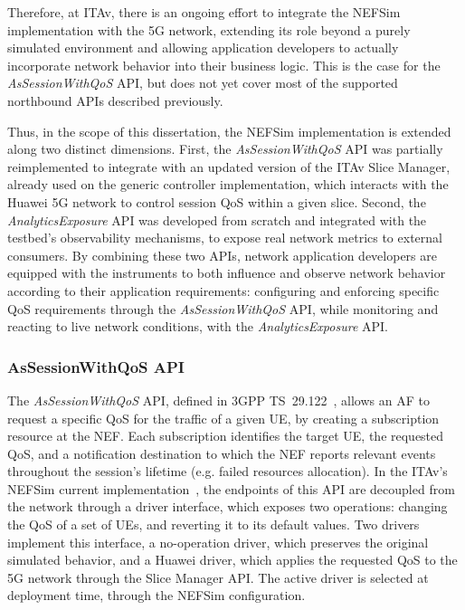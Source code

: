 Therefore, at \acs{ITAv}, there is an ongoing effort to integrate the \acs{NEF}Sim implementation with the \acs{5G} network, extending its role beyond a purely simulated environment and allowing application developers to actually incorporate network behavior into their business logic. This is the case for the \textit{AsSessionWithQoS} \acs{API}, but does not yet cover most of the supported northbound \acsp{API} described previously.

Thus, in the scope of this dissertation, the \acs{NEF}Sim implementation is extended along two distinct dimensions. First, the \textit{AsSessionWithQoS} \acs{API} was partially reimplemented to integrate with an updated version of the \acs{ITAv} Slice Manager, already used on the generic controller implementation, which interacts with the Huawei \acs{5G} network to control session \acs{QoS} within a given slice. Second, the \textit{AnalyticsExposure} \acs{API} was developed from scratch and integrated with the testbed's observability mechanisms, to expose real network metrics to external consumers. By combining these two \acsp{API}, network application developers are equipped with the instruments to both influence and observe network behavior according to their application requirements: configuring and enforcing specific \acs{QoS} requirements through the \textit{AsSessionWithQoS} \acs{API}, while monitoring and reacting to live network conditions, with the \textit{AnalyticsExposure} \acs{API}.

\subsubsection{AsSessionWithQoS \acs{API}}
\label{chap:impl:exposure:nef:AsSessionWithQoS}

The \textit{AsSessionWithQoS} \acs{API}, defined in \acs{3GPP} TS~29.122~\cite{ETSI_TS_129_122_V18_8_0}, allows an \acs{AF} to request a specific \acs{QoS} for the traffic of a given \acs{UE}, by creating a subscription resource at the \acs{NEF}. Each subscription identifies the target \acs{UE}, the requested \acs{QoS}, and a notification destination to which the \acs{NEF} reports relevant events throughout the session's lifetime (e.g. failed resources allocation). In the \acs{ITAv}'s \acs{NEF}Sim current implementation~\cite{NEFemulatorAtnog}, the endpoints of this \acs{API} are decoupled from the network through a driver interface, which exposes two operations: changing the \acs{QoS} of a set of \acsp{UE}, and reverting it to its default values. Two drivers implement this interface, a no-operation driver, which preserves the original simulated behavior, and a Huawei driver, which applies the requested \acs{QoS} to the \acs{5G} network through the Slice Manager \acs{API}. The active driver is selected at deployment time, through the NEFSim configuration.

